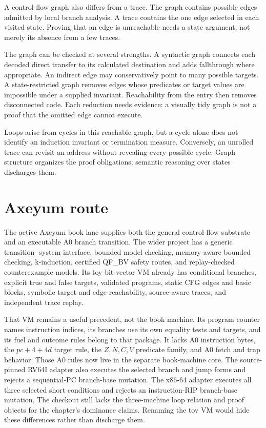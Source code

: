 A control-flow graph also differs from a trace. The graph contains possible
edges admitted by local branch analysis. A trace contains the one edge
selected in each visited state. Proving that an edge is unreachable needs a
state argument, not merely its absence from a few traces.

The graph can be checked at several strengths. A syntactic graph connects each
decoded direct transfer to its calculated destination and adds fallthrough
where appropriate. An indirect edge may conservatively point to many possible
targets. A state-restricted graph removes edges whose predicates or target
values are impossible under a supplied invariant. Reachability from the entry
then removes disconnected code. Each reduction needs evidence: a visually
tidy graph is not a proof that the omitted edge cannot execute.

Loops arise from cycles in this reachable graph, but a cycle alone does not
identify an induction invariant or termination measure. Conversely, an
unrolled trace can revisit an address without revealing every possible cycle.
Graph structure organizes the proof obligations; semantic reasoning over
states discharges them.

\section{Axeyum route}

The active Axeyum book lane supplies both the general control-flow substrate
and an executable A0 branch transition. The wider project has a generic transition-
system interface, bounded model checking, memory-aware bounded checking,
k-induction, certified QF\_BV safety routes, and replay-checked counterexample
models. Its toy bit-vector VM already has conditional branches, explicit true
and false targets, validated programs, static CFG edges and basic blocks,
symbolic target and edge reachability, source-aware traces, and independent
trace replay.

That VM remains a useful precedent, not the book machine. Its program counter names
instruction indices, its branches use its own equality tests and targets, and
its fuel and outcome rules belong to that package. It lacks A0 instruction
bytes, the \(pc+4+4d\) target rule, the \(Z,N,C,V\) predicate family, and A0
fetch and trap behavior. Those A0 rules now live in the separate book-machine
core. The source-pinned RV64I adapter also executes the selected branch and
jump forms and rejects a sequential-PC branch-base mutation. The x86-64
adapter executes all three selected short conditions and rejects an
instruction-RIP branch-base mutation. The checkout still lacks the
three-machine loop relation and proof objects for the chapter's dominance claims. Renaming the toy VM would
hide these differences rather than discharge them.

